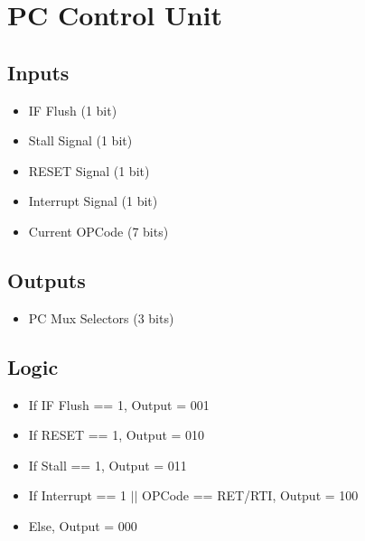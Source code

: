 \documentclass[12pt]{report}
\begin{document}
\section{PC Control Unit}

\subsection{Inputs}
\begin{itemize}
    \item IF Flush (1 bit)
    \item Stall Signal (1 bit)
    \item RESET Signal (1 bit)
    \item Interrupt Signal (1 bit)
    \item Current OPCode (7 bits)
\end{itemize}

\subsection{Outputs}
\begin{itemize}
    \item PC Mux Selectors (3 bits)
\end{itemize}

\subsection{Logic}
\begin{itemize}
    \item If IF Flush == 1, Output = 001
    \item If RESET == 1, Output = 010
    \item If Stall == 1, Output = 011
    \item If Interrupt == 1 $||$ OPCode == RET/RTI, Output = 100
    \item Else, Output = 000
\end{itemize}
\end{document}
